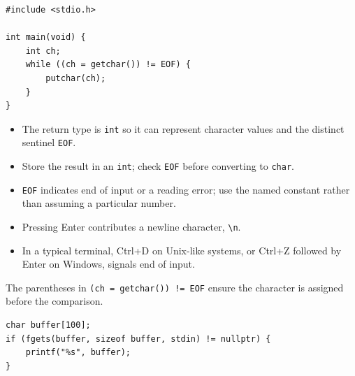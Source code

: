 \documentclass[11pt,a4paper]{article}
\providecommand{\tightlist}{\setlength{\itemsep}{0pt}\setlength{\parskip}{0pt}}
\begin{document}
\label{getchar-one-character-at-a-time}
\hypertarget{getchar-one-character-at-a-time}{}

\begin{lstlisting}[style=cscode]
#include <stdio.h>

int main(void) {
    int ch;
    while ((ch = getchar()) != EOF) {
        putchar(ch);
    }
}
\end{lstlisting}

\begin{itemize}
\tightlist
\item
  The return type is \texttt{int} so it can represent character values and the distinct sentinel \texttt{EOF}.
\item
  Store the result in an \texttt{int}; check \texttt{EOF} before converting to \texttt{char}.
\item
  \texttt{EOF} indicates end of input or a reading error; use the named constant rather than assuming a particular number.
\item
  Pressing Enter contributes a newline character, \texttt{\textquotesingle{}\textbackslash{}n\textquotesingle{}}.
\item
  In a typical terminal, Ctrl+D on Unix-like systems, or Ctrl+Z followed by Enter on Windows, signals end of input.
\end{itemize}

The parentheses in \texttt{(ch\ =\ getchar())\ !=\ EOF} ensure the character is assigned before the comparison.

\label{fgets-reading-into-a-caller-provided-buffer}
\hypertarget{fgets-reading-into-a-caller-provided-buffer}{}

\begin{lstlisting}[style=cscode]
char buffer[100];
if (fgets(buffer, sizeof buffer, stdin) != nullptr) {
    printf("%s", buffer);
}
\end{lstlisting}
\end{document}
